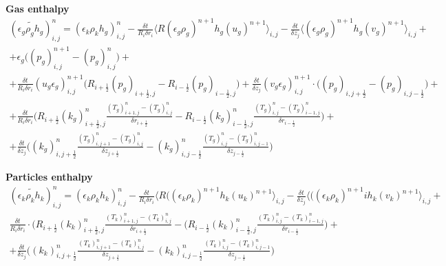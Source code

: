 {\bf Gas enthalpy}\\
%
\begin{eqnarray}
(\widetilde{\epsilon_g \rho_g h_g})^n_{i,j} = 
(\epsilon_k \rho_k h_g)_{i,j}^{n} -
\frac {\delta t}{R_i \delta r_{i}} 
\langle R (\epsilon_g \rho_g)^{n+1} h_g (u_g)^{n+1} \rangle_{i,j} -
\frac {\delta t}{\delta z_{j}} 
\langle (\epsilon_g \rho_g)^{n+1} h_g (v_g)^{n+1} \rangle_{i,j} + \nonumber \\
+ \epsilon_g \big ((p_g)_{i,j}^{n+1} - (p_g)_{i,j}^{n} \big )+\nonumber \\
+ \frac {\delta t} {R_i \delta r_i} (u_g \epsilon_g)_{i,j}^{n+1}
\big( R_{i+\frac{1}{2}} (p_g)_{i+\frac{1}{2},j} - 
R_{i-\frac{1}{2}} (p_g)_{i-\frac{1}{2},j} \big)
+ \frac{\delta t}{\delta z_j} (v_g \epsilon_g)_{i,j}^{n+1}
\cdot \big( (p_g)_{i,j+\frac{1}{2}} - (p_g)_{i,j-\frac{1}{2}} \big)+\nonumber \\
+ \frac {\delta t} {R_i \delta r_i} \bigg( R_{i+\frac{1}{2}} 
(k_g)_{i+\frac{1}{2},j}^{n} 
\frac{(T_g)_{i+1,j}^{n} - (T_g)_{i,j}^{n}}{\delta r_{i+\frac{1}{2}}} 
- R_{i-\frac{1}{2}} (k_g)_{i-\frac{1}{2},j}^{n} 
\frac{(T_g)_{i,j}^{n} - (T_g)_{i-1,j}^{n}}{\delta r_{i-\frac{1}{2}}} \bigg)+ \nonumber \\
+ \frac {\delta t} {\delta z_j} \bigg( (k_g)_{i,j+\frac{1}{2}}^{n} 
\frac{(T_g)_{i,j+1}^{n} - (T_g)_{i,j}^{n}}{\delta z_{j+\frac{1}{2}}} - 
(k_g)_{i,j-\frac{1}{2}}^{n} \frac{(T_g)_{i,j}^{n} - 
(T_g)_{i,j-1}^{n}}{\delta z_{j-\frac{1}{2}}} \bigg)
\nonumber
\end{eqnarray}

{\bf Particles enthalpy}\\
%
\begin{eqnarray}
(\widetilde{\epsilon_k \rho_k h_k})^n_{i,j} = 
(\epsilon_k \rho_k h_k)_{i,j}^{n} -
\frac {\delta t}{R_i \delta r_{i}}
\langle R ((\epsilon_k \rho_k)^{n+1} h_k (u_k)^{n+1} \rangle_{i,j}-
\frac {\delta t}{\delta z_{j}}\langle ((\epsilon_k \rho_k)^{n+1} i
h_k (v_k)^{n+1} \rangle_{i,j} +\nonumber \\
\frac {\delta t} {R_i \delta r_i}
\cdot \bigg( R_{i+\frac{1}{2}} (k_k)_{i+\frac{1}{2},j}^{n} 
\frac{(T_k)_{i+1,j}^{n} - (T_k)_{i,j}^{n}}{\delta r_{i+\frac{1}{2}}} - 
( R_{i-\frac{1}{2}} (k_k)_{i-\frac{1}{2},j}^{n} 
\frac{(T_k)_{i,j}^{n} - (T_k)_{i-1,j}^{n}}{\delta r_{i-\frac{1}{2}}} \bigg) + \nonumber \\
+ \frac {\delta t} {\delta z_j} \bigg( (k_k)_{i,j+\frac{1}{2}}^{n} 
\frac{(T_k)_{i,j+1}^{n} - (T_k)_{i,j}^{n}}{\delta z_{j+\frac{1}{2}}} - 
(k_k)_{i,j-\frac{1}{2}}^{n} \frac{(T_k)_{i,j}^{n} - 
(T_k)_{i,j-1}^{n}}{\delta z_{j-\frac{1}{2}}} \bigg)
\nonumber
\end{eqnarray}
\newpage
%
